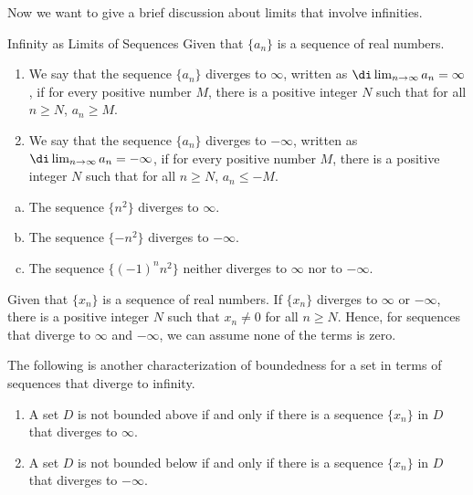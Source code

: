 Now we want to give a brief discussion about limits that involve infinities.  
\begin{definition}{Infinity as Limits of Sequences}
Given that $\{a_n\}$ is a sequence of real numbers.
\begin{enumerate}[1.]
\item
We say that the sequence $\{a_n\}$ diverges to $\infty$, written as
$\di \lim_{n\rightarrow \infty}a_n=\infty$,
if for every positive number $M$, there is a positive integer $N$ such that for all $n\geq N$,
$a_n\geq M$.
\item
We say that the sequence $\{a_n\}$ diverges to $-\infty$, written as
$\di \lim_{n\rightarrow \infty}a_n=-\infty$,
if for every positive number $M$, there is a positive integer $N$ such that for all $n\geq N$,
$a_n\leq -M$.
\end{enumerate}\end{definition}
 
\begin{example}{}
\begin{enumerate}[(a)]
\item
The sequence $\{n^2\}$ diverges to $\infty$.
\item The sequence $\{-n^2\}$ diverges to $-\infty$.
\item The sequence $\{(-1)^nn^2\}$ neither diverges to $\infty$ nor to $-\infty$.
\end{enumerate}
\end{example}

Given that $\{x_n\}$ is a sequence of  real numbers. If $\{x_n\}$ diverges to $\infty$ or $-\infty$, there is a positive integer $N$ such that $x_n\neq 0$ for all $n\geq N$. Hence, for sequences that diverge to $\infty$ and $-\infty$, we can assume none of the terms is zero.
 

The following is another characterization of boundedness for a set in terms of sequences that diverge to infinity.
\begin{highlight}{}

\begin{enumerate}[1.]
\item A set $D$ is not bounded above if and only if there is a sequence $\{x_n\}$ in $D$ that diverges to $\infty$. 
\item A set $D$ is not bounded below if and only if there is a sequence $\{x_n\}$ in $D$ that diverges to $-\infty$. 
\end{enumerate}
\end{highlight}

